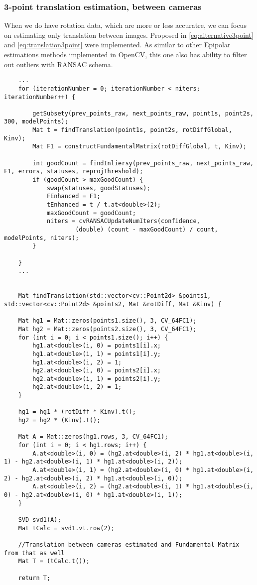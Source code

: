 \subsubsection{3-point translation estimation, between cameras}
When we do have rotation data, which are more or less accuratre, we can focus on estimating only translation between images. Proposed in \ref{eq:alternative3point} and \ref{eq:translation3point} were implemented. As similar to other Epipolar estimations methods implemented in OpenCV, this one also has ability to filter out outliers with RANSAC schema.
\begin{lstlisting}
    ...
    for (iterationNumber = 0; iterationNumber < niters; iterationNumber++) {

        getSubsety(prev_points_raw, next_points_raw, point1s, point2s, 300, modelPoints);
        Mat t = findTranslation(point1s, point2s, rotDiffGlobal, Kinv);
        Mat F1 = constructFundamentalMatrix(rotDiffGlobal, t, Kinv);

        int goodCount = findInliersy(prev_points_raw, next_points_raw, F1, errors, statuses, reprojThreshold);
        if (goodCount > maxGoodCount) {
            swap(statuses, goodStatuses);
            FEnhanced = F1;
            tEnhanced = t / t.at<double>(2);
            maxGoodCount = goodCount;
            niters = cvRANSACUpdateNumIters(confidence,
                    (double) (count - maxGoodCount) / count, modelPoints, niters);
        }

    }
    ...
    
    
    Mat findTranslation(std::vector<cv::Point2d> &points1, std::vector<cv::Point2d> &points2, Mat &rotDiff, Mat &Kinv) {

    Mat hg1 = Mat::zeros(points1.size(), 3, CV_64FC1);
    Mat hg2 = Mat::zeros(points2.size(), 3, CV_64FC1);
    for (int i = 0; i < points1.size(); i++) {
        hg1.at<double>(i, 0) = points1[i].x;
        hg1.at<double>(i, 1) = points1[i].y;
        hg1.at<double>(i, 2) = 1;
        hg2.at<double>(i, 0) = points2[i].x;
        hg2.at<double>(i, 1) = points2[i].y;
        hg2.at<double>(i, 2) = 1;
    }

    hg1 = hg1 * (rotDiff * Kinv).t();
    hg2 = hg2 * (Kinv).t();

    Mat A = Mat::zeros(hg1.rows, 3, CV_64FC1);
    for (int i = 0; i < hg1.rows; i++) {
        A.at<double>(i, 0) = (hg2.at<double>(i, 2) * hg1.at<double>(i, 1) - hg2.at<double>(i, 1) * hg1.at<double>(i, 2));
        A.at<double>(i, 1) = (hg2.at<double>(i, 0) * hg1.at<double>(i, 2) - hg2.at<double>(i, 2) * hg1.at<double>(i, 0));
        A.at<double>(i, 2) = (hg2.at<double>(i, 1) * hg1.at<double>(i, 0) - hg2.at<double>(i, 0) * hg1.at<double>(i, 1));
    }

    SVD svd1(A);
    Mat tCalc = svd1.vt.row(2);

    //Translation between cameras estimated and Fundamental Matrix from that as well
    Mat T = (tCalc.t());

    return T;

\end{lstlisting}

